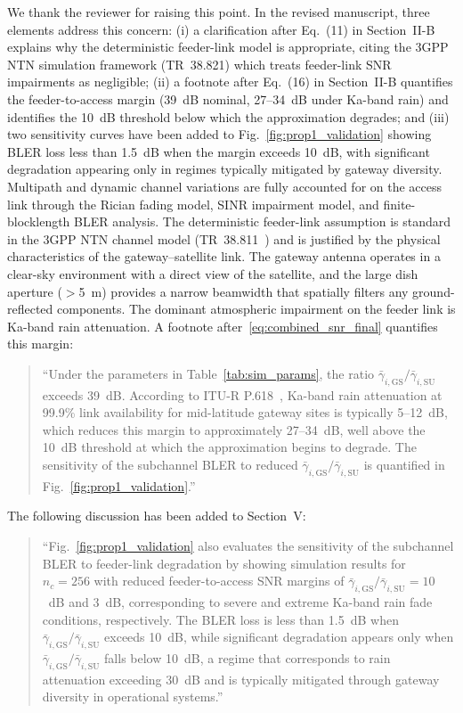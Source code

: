 We thank the reviewer for raising this point. In the revised manuscript, three elements address this concern: (i) a clarification after Eq.~(11) in Section~II-B explains why the deterministic feeder-link model is appropriate, citing the 3GPP NTN simulation framework (TR~38.821) which treats feeder-link SNR impairments as negligible; (ii) a footnote after Eq.~(16) in Section~II-B quantifies the feeder-to-access margin (39~dB nominal, 27--34~dB under Ka-band rain) and identifies the 10~dB threshold below which the approximation degrades; and (iii) two sensitivity curves have been added to Fig.~\ref{fig:prop1_validation} showing BLER loss less than 1.5~dB when the margin exceeds 10~dB, with significant degradation appearing only in regimes typically mitigated by gateway diversity. Multipath and dynamic channel variations are fully accounted for on the access link through the Rician fading model, SINR impairment model, and finite-blocklength BLER analysis. The deterministic feeder-link assumption is standard in the 3GPP NTN channel model (TR~38.811~\cite{3GPP_TR38811}) and is justified by the physical characteristics of the gateway--satellite link. The gateway antenna operates in a clear-sky environment with a direct view of the satellite, and the large dish aperture ($>$5~m) provides a narrow beamwidth that spatially filters any ground-reflected components. The dominant atmospheric impairment on the feeder link is Ka-band rain attenuation. A footnote after~\eqref{eq:combined_snr_final} quantifies this margin:

\begin{quote}
``{\color{blue}Under the parameters in Table~\ref{tab:sim_params}, the ratio $\bar{\gamma}_{i,\mathrm{GS}}/\bar{\gamma}_{i,\mathrm{SU}}$ exceeds 39~dB. According to ITU-R P.618~\cite{ITU-R_P618-14}, Ka-band rain attenuation at 99.9\% link availability for mid-latitude gateway sites is typically 5--12~dB, which reduces this margin to approximately 27--34~dB, well above the 10~dB threshold at which the approximation begins to degrade. The sensitivity of the subchannel BLER to reduced $\bar{\gamma}_{i,\mathrm{GS}}/\bar{\gamma}_{i,\mathrm{SU}}$ is quantified in Fig.~\ref{fig:prop1_validation}.}''
\end{quote}

The following discussion has been added to Section~V:

\begin{quote}
``{\color{blue}Fig.~\ref{fig:prop1_validation} also evaluates the sensitivity of the subchannel BLER to feeder-link degradation by showing simulation results for $n_c = 256$ with reduced feeder-to-access SNR margins of $\bar{\gamma}_{i,\mathrm{GS}}/\bar{\gamma}_{i,\mathrm{SU}} = 10$~dB and $3$~dB, corresponding to severe and extreme Ka-band rain fade conditions, respectively. The BLER loss is less than 1.5~dB when $\bar{\gamma}_{i,\mathrm{GS}}/\bar{\gamma}_{i,\mathrm{SU}}$ exceeds 10~dB, while significant degradation appears only when $\bar{\gamma}_{i,\mathrm{GS}}/\bar{\gamma}_{i,\mathrm{SU}}$ falls below 10~dB, a regime that corresponds to rain attenuation exceeding 30~dB and is typically mitigated through gateway diversity in operational systems.}''
\end{quote}

